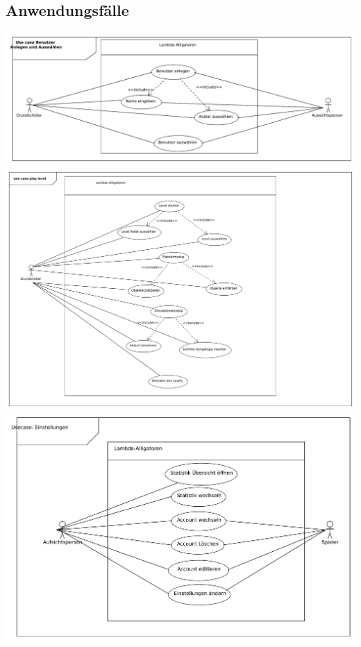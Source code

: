 \subsection{Anwendungsfälle}
\clearpage
\includegraphics[scale=0.6]{Systemmodelle/add_use_case.pdf}
\clearpage
\includegraphics[scale=0.6]{Systemmodelle/level_use_case.pdf}
\clearpage
\includegraphics[scale=0.6]{Systemmodelle/settings_use_case.pdf}

